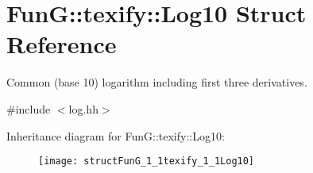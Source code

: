 \hypertarget{structFunG_1_1texify_1_1Log10}{\section{Fun\-G\-:\-:texify\-:\-:Log10 Struct Reference}
\label{structFunG_1_1texify_1_1Log10}
}


Common (base 10) logarithm including first three derivatives.  




{\ttfamily \#include $<$log.\-hh$>$}

Inheritance diagram for Fun\-G\-:\-:texify\-:\-:Log10\-:\begin{figure}[H]
\begin{center}
\leavevmode
\texttt{[image: structFunG\_1\_1texify\_1\_1Log10]}
\end{center}
\end{figure}
